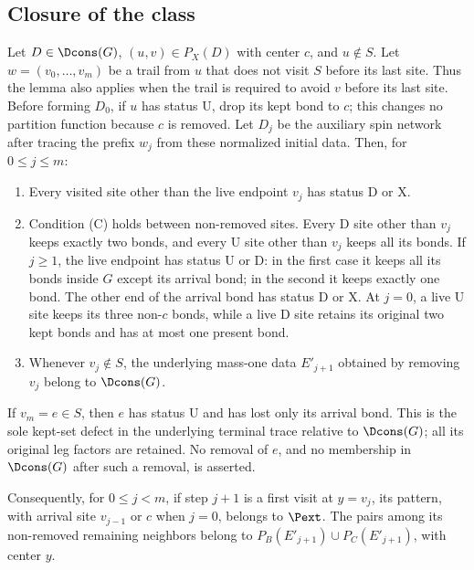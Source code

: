 \subsection{Closure of the class}\label{s:closure}

\begin{lemma}\label{l:closure}
Let $D\in\Dcons(G)$, $(u,v)\in P_X(D)$ with center $c$, and
$u\notin S$. Let $w=(v_0,\dots,v_m)$ be a trail from $u$ that does
not visit $S$ before its last site. Thus the lemma also applies when
the trail is required to avoid $v$ before its last site. Before forming
$D_0$, if $u$ has status $\mathrm U$, drop its kept bond to $c$;
this changes no partition function because $c$ is removed. Let $D_j$
be the auxiliary spin network after tracing the prefix $w_j$ from
these normalized initial data. Then, for $0\le j\le m$:
\begin{enumerate}
\item Every visited site other than the live endpoint $v_j$ has
status $\mathrm D$ or $\mathrm X$.
\item Condition (C) holds between non-removed sites. Every
$\mathrm D$ site other than $v_j$ keeps exactly two bonds, and every
$\mathrm U$ site other than $v_j$ keeps all its bonds. If $j\ge1$,
the live endpoint has status $\mathrm U$ or $\mathrm D$: in the
first case it keeps all its bonds inside $G$ except its arrival bond;
in the second it keeps exactly one bond. The other end of the arrival
bond has status $\mathrm D$ or $\mathrm X$. At $j=0$, a live
$\mathrm U$ site keeps its three non-$c$ bonds, while a live
$\mathrm D$ site retains its original two kept bonds and has at most
one present bond.
\item Whenever $v_j\notin S$, the underlying mass-one data
$E'_{j+1}$ obtained by removing $v_j$ belong to $\Dcons(G)$.
\end{enumerate}
If $v_m=e\in S$, then $e$ has status $\mathrm U$ and has lost only
its arrival bond. This is the sole kept-set defect in the underlying
terminal trace relative to $\Dcons(G)$; all its original leg factors
are retained. No removal of $e$, and no membership in $\Dcons(G)$
after such a removal, is asserted.

Consequently, for $0\le j<m$, if step $j+1$ is a first visit at
$y=v_j$, its pattern, with arrival site $v_{j-1}$ or $c$ when
$j=0$, belongs to $\Pext$. The pairs among its non-removed remaining
neighbors belong to $P_B(E'_{j+1})\cup P_C(E'_{j+1})$, with
center $y$.
\end{lemma}

